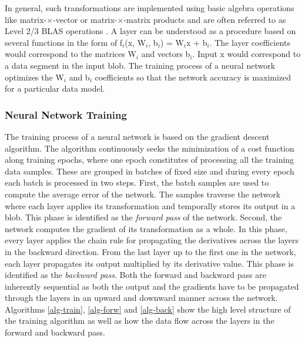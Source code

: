 In general, such transformations are implemented using basic algebra 
operations like matrix-$\times$-vector or matrix-$\times$-matrix products and are often referred to as Level 2/3 BLAS operations \cite{blackford2002updated,dongarra2002preface}. 
A layer can be understood as a procedure based on several functions in the 
form of f$_i$(x, W$_i$, b$_i$) = W$_i$x + b$_i$. The layer coefficients 
would correspond to the matrices W$_i$ and vectors b$_i$. Input x would 
correspond to a data segment in the input blob. The training process 
of a neural network optimizes the W$_i$ and b$_i$ coefficients so that 
the network accuracy is maximized for a particular data model.

\subsubsection{Neural Network Training}
The training process of a neural network is based on the gradient
descent algorithm. The algorithm continuously seeks the minimization of a cost function along training epochs, where one epoch 
constitutes of processing all the training data samples. These are 
grouped in batches of fixed size and during every epoch each batch 
is processed in two steps. First, the batch samples are used to 
compute the average error of the network. The samples 
traverse the network where each layer applies its transformation and 
temporally stores its output in a blob. This phase is identified as 
the \emph{forward pass} of the network. Second, the network computes the 
gradient of its transformation as a whole. In this phase, every layer 
applies the chain rule for propagating the derivatives across the layers in the backward direction. From the 
last layer up to the first one in the network, each layer propagates 
its output multiplied by its derivative value. This phase is identified 
as the \emph{backward pass}. Both the forward and backward pass are 
inherently sequential as both the output and the gradients have to 
be propagated through the layers in an upward and downward manner across 
the network. Algorithms \ref{alg-train}, \ref{alg-forw} and \ref{alg-back} 
show the high level structure of the training algorithm as well as 
how the data flow across the layers in the forward and backward pass.
 
